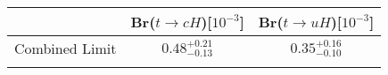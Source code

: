 \centering
\begin{tabular}{ccc} \toprule\toprule
 & Br($t\to cH$)[$10^{-3}$] & Br($t\to uH$)[$10^{-3}$]\\\midrule
Combined Limit & $0.48^{+0.21}_{-0.13}$ & $0.35^{+0.16}_{-0.10}$\\
\bottomrule\bottomrule\\
\end{tabular}